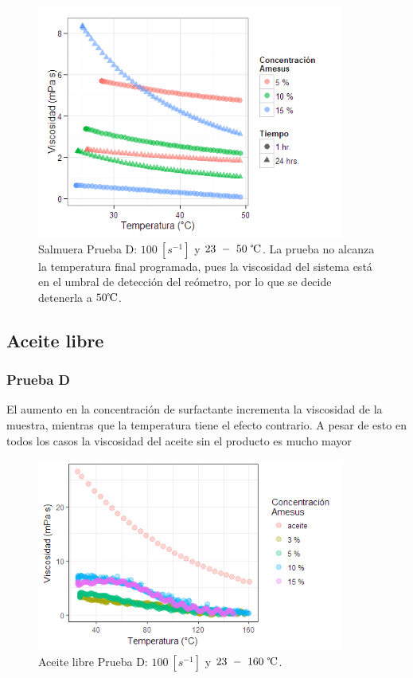     \begin{figure}[h]
        \centering
        \includegraphics[width=0.9\textwidth]{R_plot/Rplot12.png}
        \caption[Prueba D salmuera]{Salmuera Prueba D: $100~[s^{-1}]$ y $23~-~50~\celsius$. La prueba no alcanza la temperatura final programada, pues la viscosidad del sistema está en el umbral de detección del reómetro, por lo que se decide detenerla a $50\celsius$.}
    \label{fig:DR12}
\end{figure}


\subsection{Aceite libre}
    \subsubsection{Prueba D}
    El aumento en la concentración de surfactante incrementa la viscosidad de la muestra, mientras que la temperatura tiene el efecto contrario. A pesar de esto en todos los casos la viscosidad del aceite sin el producto es mucho mayor 
    \begin{figure}[h]
        \centering
        \includegraphics[width=0.9\textwidth]{R_plot/Rplot13.png}
        \caption[Prueba D aceite]{Aceite libre Prueba D: $100~[s^{-1}]$ y $23~-~160~\celsius$.}
        \label{fig:Daceite}
    \end{figure}


